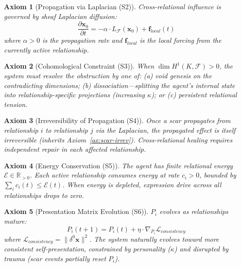 \documentclass[11pt]{article}
\newtheorem{axiom}{Axiom}[section]
\begin{document}
\begin{axiom}[Propagation via Laplacian (S2)]
\label{ax:sheaf-propagation}
Cross-relational influence is governed by sheaf Laplacian diffusion:
\begin{equation}
\frac{\partial \mathbf{x}_0}{\partial t} = -\alpha \cdot L_\mathcal{F}(\mathbf{x}_0) + \mathbf{f}_{local}(t)
\end{equation}
where $\alpha > 0$ is the propagation rate and $\mathbf{f}_{local}$ is the local forcing from the currently active relationship.
\end{axiom}

\begin{axiom}[Cohomological Constraint (S3)]
\label{ax:sheaf-cohomological}
When $\dim H^1(K, \mathcal{F}) > 0$, the system must resolve the obstruction by one of: (a) void genesis on the contradicting dimensions; (b) dissociation---splitting the agent's internal state into relationship-specific projections (increasing $\kappa$); or (c) persistent relational tension.
\end{axiom}

\begin{axiom}[Irreversibility of Propagation (S4)]
\label{ax:sheaf-irrev}
Once a scar propagates from relationship $i$ to relationship $j$ via the Laplacian, the propagated effect is itself irreversible (inherits Axiom~\ref{ax:scar-irrev}). Cross-relational healing requires independent repair in each affected relationship.
\end{axiom}

\begin{axiom}[Energy Conservation (S5)]
\label{ax:sheaf-energy}
The agent has finite relational energy $\mathcal{E} \in \mathbb{R}_{>0}$. Each active relationship consumes energy at rate $c_i > 0$, bounded by $\sum_i c_i(t) \leq \mathcal{E}(t)$. When energy is depleted, expression drive across all relationships drops to zero.
\end{axiom}

\begin{axiom}[Presentation Matrix Evolution (S6)]
\label{ax:sheaf-evolution}
$P_i$ evolves as relationships mature:
\begin{equation}
P_i(t+1) = P_i(t) + \eta \cdot \nabla_{P_i} \mathcal{L}_{consistency}
\end{equation}
where $\mathcal{L}_{consistency} = \|\delta^0 \mathbf{x}\|^2$. The system naturally evolves toward more consistent self-presentation, constrained by personality ($\kappa$) and disrupted by trauma (scar events partially reset $P_i$).
\end{axiom}
\end{document}
